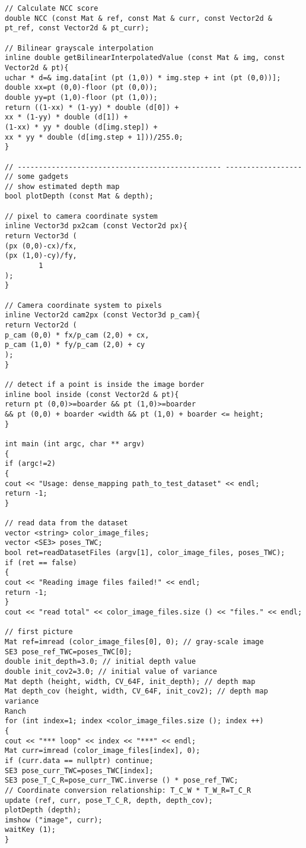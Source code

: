 \begin{lstlisting}[language=c ++, caption=slambook/ch13/dense \_monocular/dense \_mapping.cpp (fragment)]
// Calculate NCC score
double NCC (const Mat & ref, const Mat & curr, const Vector2d & pt_ref, const Vector2d & pt_curr);

// Bilinear grayscale interpolation
inline double getBilinearInterpolatedValue (const Mat & img, const Vector2d & pt){
uchar * d=& img.data[int (pt (1,0)) * img.step + int (pt (0,0))];
double xx=pt (0,0)-floor (pt (0,0));
double yy=pt (1,0)-floor (pt (1,0));
return ((1-xx) * (1-yy) * double (d[0]) +
xx * (1-yy) * double (d[1]) +
(1-xx) * yy * double (d[img.step]) +
xx * yy * double (d[img.step + 1]))/255.0;
}

// ------------------------------------------------ ------------------
// some gadgets
// show estimated depth map
bool plotDepth (const Mat & depth);

// pixel to camera coordinate system
inline Vector3d px2cam (const Vector2d px){
return Vector3d (
(px (0,0)-cx)/fx,
(px (1,0)-cy)/fy,
		1
);
}

// Camera coordinate system to pixels
inline Vector2d cam2px (const Vector3d p_cam){
return Vector2d (
p_cam (0,0) * fx/p_cam (2,0) + cx,
p_cam (1,0) * fy/p_cam (2,0) + cy
);
}

// detect if a point is inside the image border
inline bool inside (const Vector2d & pt){
return pt (0,0)>=boarder && pt (1,0)>=boarder
&& pt (0,0) + boarder <width && pt (1,0) + boarder <= height;
}

int main (int argc, char ** argv)
{
if (argc!=2)
{
cout << "Usage: dense_mapping path_to_test_dataset" << endl;
return -1;
}

// read data from the dataset
vector <string> color_image_files;
vector <SE3> poses_TWC;
bool ret=readDatasetFiles (argv[1], color_image_files, poses_TWC);
if (ret == false)
{
cout << "Reading image files failed!" << endl;
return -1;
}
cout << "read total" << color_image_files.size () << "files." << endl;

// first picture
Mat ref=imread (color_image_files[0], 0); // gray-scale image
SE3 pose_ref_TWC=poses_TWC[0];
double init_depth=3.0; // initial depth value
double init_cov2=3.0; // initial value of variance
Mat depth (height, width, CV_64F, init_depth); // depth map
Mat depth_cov (height, width, CV_64F, init_cov2); // depth map variance
Ranch
for (int index=1; index <color_image_files.size (); index ++)
{
cout << "*** loop" << index << "***" << endl;
Mat curr=imread (color_image_files[index], 0);
if (curr.data == nullptr) continue;
SE3 pose_curr_TWC=poses_TWC[index];
SE3 pose_T_C_R=pose_curr_TWC.inverse () * pose_ref_TWC;
// Coordinate conversion relationship: T_C_W * T_W_R=T_C_R
update (ref, curr, pose_T_C_R, depth, depth_cov);
plotDepth (depth);
imshow ("image", curr);
waitKey (1);
}


\end{lstlisting}

